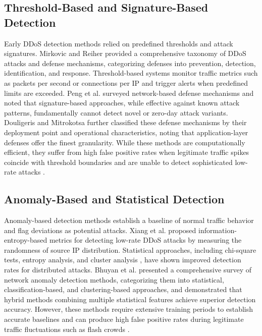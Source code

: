 \documentclass[conference]{IEEEtran}
\begin{document}
\subsection{Threshold-Based and Signature-Based Detection}

Early DDoS detection methods relied on predefined thresholds and attack signatures. Mirkovic and Reiher \cite{b1} provided a comprehensive taxonomy of DDoS attacks and defense mechanisms, categorizing defenses into prevention, detection, identification, and response. Threshold-based systems monitor traffic metrics such as packets per second or connections per IP and trigger alerts when predefined limits are exceeded. Peng et al. \cite{b12} surveyed network-based defense mechanisms and noted that signature-based approaches, while effective against known attack patterns, fundamentally cannot detect novel or zero-day attack variants. Douligeris and Mitrokotsa \cite{b18} further classified these defense mechanisms by their deployment point and operational characteristics, noting that application-layer defenses offer the finest granularity. While these methods are computationally efficient, they suffer from high false positive rates when legitimate traffic spikes coincide with threshold boundaries and are unable to detect sophisticated low-rate attacks \cite{b4}.

\subsection{Anomaly-Based and Statistical Detection}

Anomaly-based detection methods establish a baseline of normal traffic behavior and flag deviations as potential attacks. Xiang et al. \cite{b4} proposed information-entropy-based metrics for detecting low-rate DDoS attacks by measuring the randomness of source IP distribution. Statistical approaches, including chi-square tests, entropy analysis, and cluster analysis \cite{b20}, have shown improved detection rates for distributed attacks. Bhuyan et al. \cite{b13} presented a comprehensive survey of network anomaly detection methods, categorizing them into statistical, classification-based, and clustering-based approaches, and demonstrated that hybrid methods combining multiple statistical features achieve superior detection accuracy. However, these methods require extensive training periods to establish accurate baselines and can produce high false positive rates during legitimate traffic fluctuations such as flash crowds \cite{b5}.
\end{document}
